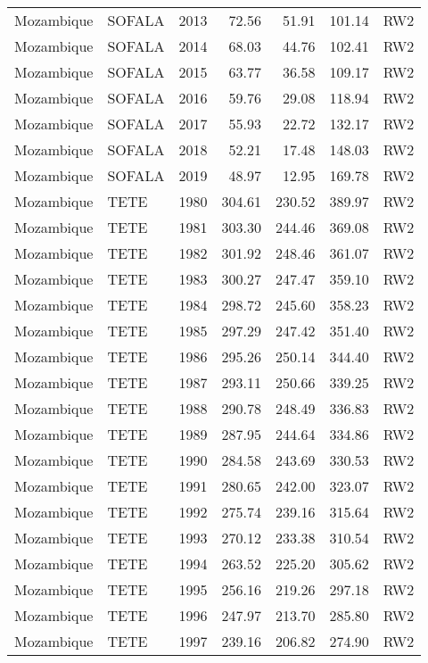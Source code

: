 \begin{longtable}{lllrrrl}
  Mozambique & SOFALA & 2013 & 72.56 & 51.91 & 101.14 & RW2 \\ 
  Mozambique & SOFALA & 2014 & 68.03 & 44.76 & 102.41 & RW2 \\ 
  Mozambique & SOFALA & 2015 & 63.77 & 36.58 & 109.17 & RW2 \\ 
  Mozambique & SOFALA & 2016 & 59.76 & 29.08 & 118.94 & RW2 \\ 
  Mozambique & SOFALA & 2017 & 55.93 & 22.72 & 132.17 & RW2 \\ 
  Mozambique & SOFALA & 2018 & 52.21 & 17.48 & 148.03 & RW2 \\ 
  Mozambique & SOFALA & 2019 & 48.97 & 12.95 & 169.78 & RW2 \\ 
  Mozambique & TETE & 1980 & 304.61 & 230.52 & 389.97 & RW2 \\ 
  Mozambique & TETE & 1981 & 303.30 & 244.46 & 369.08 & RW2 \\ 
  Mozambique & TETE & 1982 & 301.92 & 248.46 & 361.07 & RW2 \\ 
  Mozambique & TETE & 1983 & 300.27 & 247.47 & 359.10 & RW2 \\ 
  Mozambique & TETE & 1984 & 298.72 & 245.60 & 358.23 & RW2 \\ 
  Mozambique & TETE & 1985 & 297.29 & 247.42 & 351.40 & RW2 \\ 
  Mozambique & TETE & 1986 & 295.26 & 250.14 & 344.40 & RW2 \\ 
  Mozambique & TETE & 1987 & 293.11 & 250.66 & 339.25 & RW2 \\ 
  Mozambique & TETE & 1988 & 290.78 & 248.49 & 336.83 & RW2 \\ 
  Mozambique & TETE & 1989 & 287.95 & 244.64 & 334.86 & RW2 \\ 
  Mozambique & TETE & 1990 & 284.58 & 243.69 & 330.53 & RW2 \\ 
  Mozambique & TETE & 1991 & 280.65 & 242.00 & 323.07 & RW2 \\ 
  Mozambique & TETE & 1992 & 275.74 & 239.16 & 315.64 & RW2 \\ 
  Mozambique & TETE & 1993 & 270.12 & 233.38 & 310.54 & RW2 \\ 
  Mozambique & TETE & 1994 & 263.52 & 225.20 & 305.62 & RW2 \\ 
  Mozambique & TETE & 1995 & 256.16 & 219.26 & 297.18 & RW2 \\ 
  Mozambique & TETE & 1996 & 247.97 & 213.70 & 285.80 & RW2 \\ 
  Mozambique & TETE & 1997 & 239.16 & 206.82 & 274.90 & RW2 \\ 

\end{longtable}
